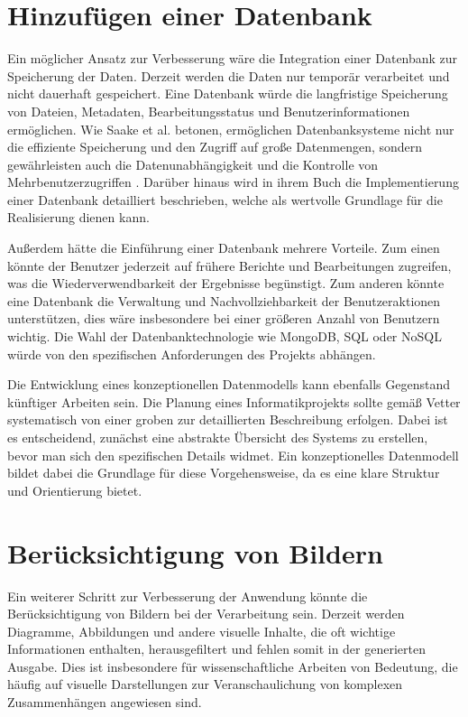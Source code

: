 \section{Hinzufügen einer Datenbank}
\label{subsec:datenbank}

Ein möglicher Ansatz zur Verbesserung wäre die Integration einer Datenbank zur Speicherung der Daten. Derzeit werden die Daten nur temporär verarbeitet und nicht dauerhaft gespeichert. Eine Datenbank würde die langfristige Speicherung von Dateien, Metadaten, Bearbeitungsstatus und Benutzerinformationen ermöglichen. Wie Saake et al. betonen, ermöglichen Datenbanksysteme nicht nur die effiziente Speicherung und den Zugriff auf große Datenmengen, sondern gewährleisten auch die Datenunabhängigkeit und die Kontrolle von Mehrbenutzerzugriffen \cite{saake2019datenbanken}. Darüber hinaus wird in ihrem Buch die Implementierung einer Datenbank detailliert beschrieben, welche als wertvolle Grundlage für die Realisierung dienen kann. 

Außerdem hätte die Einführung einer Datenbank mehrere Vorteile. Zum einen könnte der Benutzer jederzeit auf frühere Berichte und Bearbeitungen zugreifen, was die Wiederverwendbarkeit der Ergebnisse begünstigt. Zum anderen könnte eine Datenbank die Verwaltung und Nachvollziehbarkeit der Benutzeraktionen unterstützen, dies wäre insbesondere bei einer größeren Anzahl von Benutzern wichtig. Die Wahl der Datenbanktechnologie wie MongoDB, SQL oder NoSQL würde von den spezifischen Anforderungen des Projekts abhängen.

Die Entwicklung eines konzeptionellen Datenmodells kann ebenfalls Gegenstand künftiger Arbeiten sein. Die Planung eines Informatikprojekts sollte gemäß Vetter systematisch von einer groben zur detaillierten Beschreibung erfolgen. Dabei ist es entscheidend, zunächst eine abstrakte Übersicht des Systems zu erstellen, bevor man sich den spezifischen Details widmet. Ein konzeptionelles Datenmodell bildet dabei die Grundlage für diese Vorgehensweise, da es eine klare Struktur und Orientierung bietet. \cite[S.15 ff.]{vetter2013aufbau}

\section{Berücksichtigung von Bildern}

Ein weiterer Schritt zur Verbesserung der Anwendung könnte die Berücksichtigung von Bildern bei der Verarbeitung sein. Derzeit werden Diagramme, Abbildungen und andere visuelle Inhalte, die oft wichtige Informationen enthalten, herausgefiltert und fehlen somit in der generierten Ausgabe. Dies ist insbesondere für wissenschaftliche Arbeiten von Bedeutung, die häufig auf visuelle Darstellungen zur Veranschaulichung von komplexen Zusammenhängen angewiesen sind.

